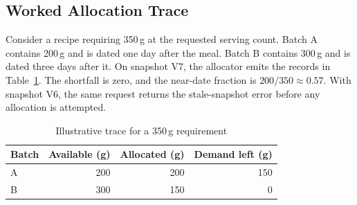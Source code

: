 \balance
\subsection{Worked Allocation Trace}
Consider a recipe requiring 350\,g at the requested serving count. Batch A contains 200\,g and is dated one day after the meal. Batch B contains 300\,g and is dated three days after it. On snapshot V7, the allocator emits the records in Table~\ref{tab:trace}. The shortfall is zero, and the near-date fraction is $200/350 \approx 0.57$. With snapshot V6, the same request returns the stale-snapshot error before any allocation is attempted.
\begin{table}[!t]
\centering
\caption{Illustrative trace for a 350\,g requirement}
\label{tab:trace}
\begin{tabular}{lrrr}
\hline
Batch & Available (g) & Allocated (g) & Demand left (g) \\
\hline
A & 200 & 200 & 150 \\
B & 300 & 150 & 0 \\
\hline
\end{tabular}
\end{table}
